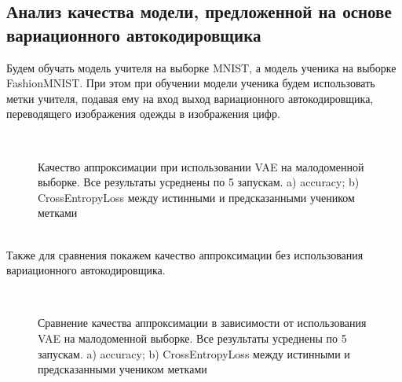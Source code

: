 \subsection{Анализ качества модели, предложенной на основе вариационного автокодировщика}
Будем обучать модель учителя на выборке MNIST, а модель ученика на выборке FashionMNIST. При этом при обучении модели ученика будем использовать метки учителя, подавая ему на вход выход вариационного автокодировщика, переводящего изображения одежды в изображения цифр.\\
\begin{figure}[h!t]\center
{}
\\
\caption{Качество аппроксимации при использовании VAE на малодоменной выборке. Все результаты усреднены по 5 запускам. a) accuracy; b) CrossEntropyLoss между истинными и предсказанными учеником метками}
\end{figure}\\
Также для сравнения покажем качество аппроксимации без использования вариационного автокодировщика.\\
\begin{figure}[h!t]\center
{}
\\
\caption{Сравнение качества аппроксимации в зависимости от использования VAE на малодоменной выборке. Все результаты усреднены по 5 запускам. a) accuracy; b) CrossEntropyLoss между истинными и предсказанными учеником метками}
\end{figure}\\

